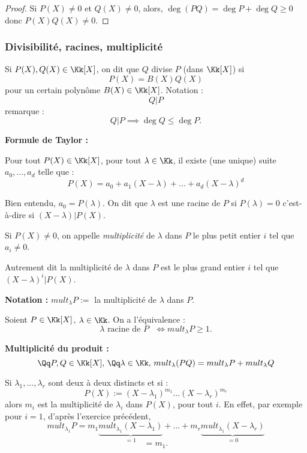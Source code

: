 \documentclass[class=report,crop=false]{standalone}
\newcommand{\mult}{mult}
\begin{document}
\begin{proof}
Si $P(X) \neq 0$ et $Q(X) \neq 0$, alors, $\deg (PQ) = \deg P +\deg Q \ge 0$ donc $P(X)Q(X) \neq 0$.
\end{proof}
\subsubsection*{Divisibilité, racines, multiplicité}

\begin{definition}
Si $P(X),Q(X) \in \Kk[X]$, on dit que $Q$ divise $P$ (dans $\Kk[X]$) si \[P(X) = B(X)Q(X)\]
pour un certain polynôme $B(X) \in \Kk[X]$. Notation : \[Q | P\]
remarque : \[Q | P \implies \deg Q \le \deg P .\] 
\end{definition}
{\bf Formule de Taylor :}

Pour tout $P(X) \in \Kk[X]$, pour tout $\lambda \in \Kk$, il existe (une unique) suite $a_0,...,a_d$ telle que :
\[P(X) = a_0 + a_1 (X-\lambda) + ... + a_d (X-\lambda)^d\]

Bien entendu, $a_0 = P(\lambda)$. On dit que $\lambda$ est une racine de $P$ si $P(\lambda) = 0$ c'est-à-dire si $(X-\lambda) | P(X)$.

Si $P(X) \neq 0$, on appelle {\it multiplicité} de $\lambda$ dans $P$ le plus petit entier $i$ tel que $a_i \neq 0$.

Autrement dit la multiplicité de $\lambda $ dans $P$ est le plus grand entier $i$ tel que $(X-\lambda)^i | P(X)$.

{\bf Notation :} $\mult_\lambda P := $ la multiplicité de $\lambda$ dans $P$\index{$\mult_\lambda P$, multiplicité}. 

\begin{remarque*}
Soient $P \in \Kk[X]$, $\lambda \in \Kk$. On a l'équivalence :
\[\lambda \mbox{ racine de $P$ } \iff \mult_\lambda P \ge 1 .\]
\end{remarque*}
\begin{exercicecours}
{\bf Multiplicité du produit :} 
\[\Qq P,Q \in \Kk[X],\, \Qq \lambda \in \Kk,\, \mult_\lambda(PQ) = \mult_\lambda P + \mult_\lambda Q\]
\end{exercicecours}

\begin{remarque*}[multiplicité]
Si $\lambda_1,...,\lambda_r$ sont deux à deux distincts et si :
\[P(X) :=(X-\lambda_1)^{m_1}...(X-\lambda_r)^{m_r}\]
alors $m_i$ est la multiplicité de $\lambda_i$ dans $P(X)$, pour tout $i$. En effet, par exemple pour $i=1$,
d'après l'exercice précédent, 
\[\mult_{\lambda_1} P = m_1\underbrace{\mult_{\lambda_1}(X-\lambda_1)}_{=1} + ... + m_r\underbrace{ \mult_{\lambda_1}(X-\lambda_r)}_{= 0}\] 
\[=m_1 .\]
\end{remarque*}
\end{document}
